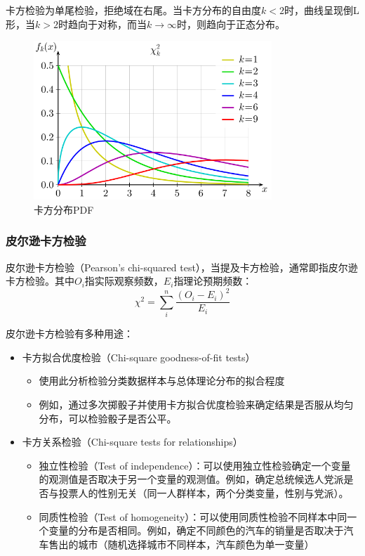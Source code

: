 \documentclass[11pt]{article}
\begin{document}
卡方检验为单尾检验，拒绝域在右尾。当卡方分布的自由度$k<2$时，曲线呈现倒L形，当$k>2$时趋向于对称，而当$k\rightarrow \infty$时，则趋向于正态分布。
\begin{figure}[H]
    \centering
    \includegraphics[width=0.8\textwidth]{fig/chi-squared.png}
    \caption{卡方分布PDF}
    \label{fig:chi-squared}
\end{figure}

\subsubsection{皮尔逊卡方检验}

皮尔逊卡方检验（Pearson's chi-squared test），当提及卡方检验，通常即指皮尔逊卡方检验。其中$O_i$指实际观察频数，$E_i$指理论预期频数：
\begin{equation*}
    \chi^2 = \sum_i^n \frac{(O_i - E_i)^2}{E_i}
\end{equation*}

皮尔逊卡方检验有多种用途：
\begin{itemize}
    \item 卡方拟合优度检验（Chi-square goodness-of-fit tests）
    \begin{itemize}
        \item 使用此分析检验分类数据样本与总体理论分布的拟合程度
        \item 例如，通过多次掷骰子并使用卡方拟合优度检验来确定结果是否服从均匀分布，可以检验骰子是否公平。
    \end{itemize}
    \item 卡方关系检验（Chi-square tests for relationships）
    \begin{itemize}
        \item 独立性检验（Test of independence）：可以使用独立性检验确定一个变量的观测值是否取决于另一个变量的观测值。例如，确定总统候选人党派是否与投票人的性别无关（同一人群样本，两个分类变量，性别与党派）。
        \item 同质性检验（Test of homogeneity）：可以使用同质性检验不同样本中同一个变量的分布是否相同。例如，确定不同颜色的汽车的销量是否取决于汽车售出的城市（随机选择城市不同样本，汽车颜色为单一变量）
    \end{itemize}
\end{itemize}
\end{document}

